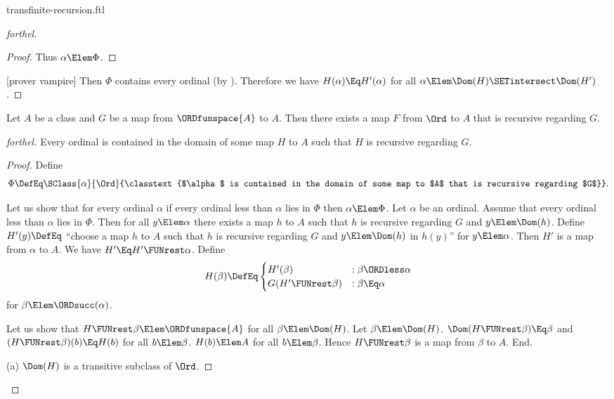 \documentclass{stex}
\begin{document}
\begin{smodule}{transfinite-recursion.ftl}
\begin{proof}[forthel]
\begin{proof}
    Thus $\alpha \Elem \Phi$.
  \end{proof}

  [prover vampire]
  Then $\Phi$ contains every ordinal (by ).
  Therefore we have $H(\alpha) \Eq H'(\alpha)$ for all $\alpha \Elem \Dom(H) \SETintersect \Dom(H')$.
\end{proof}

\begin{theorem}[forthel,title=Transfinite Recursion: Existence]
  Let $A$ be a class and $G$ be a map from $\ORDfunspace{A}$ to $A$.
  Then there exists a map $F$ from $\Ord$ to $A$ that is recursive regarding $G$.
\end{theorem}
\begin{proof}[forthel]
  Every ordinal is contained in the domain of some map $H$ to $A$ such that $H$ is recursive regarding $G$.
  \begin{proof}
    Define \[ \Phi \DefEq \SClass{\alpha}{\Ord}{\classtext{$\alpha$ is contained in the domain of some map to $A$ that is recursive regarding $G$}}. \]

    Let us show that for every ordinal $\alpha$ if every ordinal less than $\alpha$ lies in $\Phi$ then $\alpha \Elem \Phi$.
      Let $\alpha$ be an ordinal.
      Assume that every ordinal less than $\alpha$ lies in $\Phi$.
      Then for all $y \Elem \alpha$ there exists a map $h$ to $A$ such that $h$ is recursive regarding $G$ and $y \Elem \Dom(h)$.
      Define $H'(y) \DefEq$ ``choose a map $h$ to $A$ such that $h$ is recursive regarding $G$ and $y \Elem \Dom(h)$ in $h(y)$'' for $y \Elem \alpha$.
      Then $H'$ is a map from $\alpha$ to $A$.
      We have $H' \Eq H' \FUNrest \alpha$.
      Define \[ H(\beta) \DefEq
        \begin{cases}
          H'(\beta)                 & : \beta \ORDless \alpha \\
          G(H' \FUNrest \beta)  & : \beta \Eq \alpha
        \end{cases} \]
      for $\beta \Elem \ORDsucc(\alpha)$.
      
      Let us show that $H \FUNrest \beta \Elem \ORDfunspace{A}$ for all $\beta \Elem \Dom(H)$.
        Let $\beta \Elem \Dom(H)$.
        $\Dom(H \FUNrest \beta) \Eq \beta$ and $(H \FUNrest \beta)(b) \Eq H(b)$ for all $b \Elem \beta$.
        $H(b) \Elem A$ for all $b \Elem \beta$.
        Hence $H \FUNrest \beta$ is a map from $\beta$ to $A$.
      End.

      (a) $\Dom(H)$ is a transitive subclass of $\Ord$.


\end{proof}
\end{proof}
\end{smodule}
\end{document}
